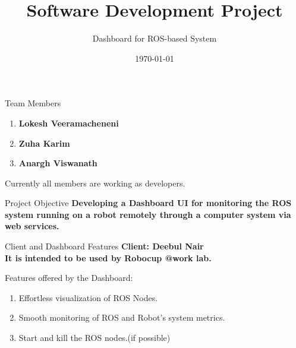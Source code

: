 \documentclass[aspectratio=169]{beamer}
\author[Dashboard for ROS-based System]{}
\title{Software Development Project}
\subtitle{Dashboard for ROS-based System}
\institute[HBRS]{Hochschule Bonn-Rhein-Sieg}
\date{\today}
\begin{document}
{
\begin{frame}
\titlepage
\end{frame}
}

\begin{frame}{Team Members}
\linespread{2}
\vspace*{-20mm}
	\begin{enumerate}
	\item \bf{Lokesh Veeramacheneni}
	\item \bf{Zuha Karim}
	\item \bf{Anargh Viswanath}
	\end{enumerate}
	\vspace*{5mm}
	Currently all members are working as developers.\\
	
\end{frame}

\begin{frame}{Project Objective}
\vspace*{-15mm}
\justify \bf{Developing a Dashboard UI for monitoring the ROS system running on a robot remotely through a computer system via web services.}
\end{frame}

\begin{frame}{Client and  Dashboard Features}
\vspace*{-15mm}
\linespread{1.5}
\bf Client: \textnormal{Deebul Nair}\\
\textnormal{It is intended to be used by \bf{Robocup @work lab}.}

	\textnormal{Features offered by the Dashboard:}
	\begin{enumerate}
	\item \textnormal{Effortless visualization of ROS Nodes.}
	\item \textnormal{Smooth monitoring of ROS and Robot's system metrics.}
	\item \textnormal{Start and kill the ROS nodes.(if possible)}
	\end{enumerate}
	
\end{frame}
\end{document}
